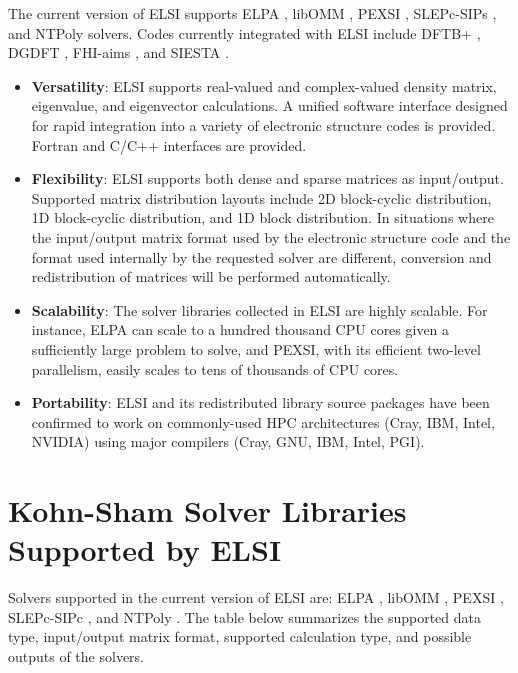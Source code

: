 \documentclass{report}
\begin{document}
The current version of ELSI supports ELPA \cite{elpa_auckenthaler_2011,elpa_marek_2014}, libOMM \cite{libomm_corsetti_2014}, PEXSI \cite{pexsi_lin_2009,pexsi_lin_2013}, SLEPc-SIPs \cite{slepc_hernandez_2005,sips_keceli_2016}, and NTPoly \cite{ntpoly_dawson_2018} solvers.  Codes currently integrated with ELSI include DFTB+ \cite{dftb+_aradi_2007}, DGDFT \cite{dgdft_hu_2015}, FHI-aims \cite{aims_blum_2009}, and SIESTA \cite{siesta_soler_2002}.

\begin{itemize}
\item \textbf{Versatility}:  ELSI supports real-valued and complex-valued density matrix, eigenvalue, and eigenvector calculations.  A unified software interface designed for rapid integration into a variety of electronic structure codes is provided.  Fortran and C/C++ interfaces are provided.

\item \textbf{Flexibility}:  ELSI supports both dense and sparse matrices as input/output.  Supported matrix distribution layouts include 2D block-cyclic distribution, 1D block-cyclic distribution, and 1D block distribution.  In situations where the input/output matrix format used by the electronic structure code and the format used internally by the requested solver are different, conversion and redistribution of matrices will be performed automatically.

\item \textbf{Scalability}:  The solver libraries collected in ELSI are highly scalable.  For instance, ELPA can scale to a hundred thousand CPU cores given a sufficiently large problem to solve, and PEXSI, with its efficient two-level parallelism, easily scales to tens of thousands of CPU cores.

\item \textbf{Portability}:  ELSI and its redistributed library source packages have been confirmed to work on commonly-used HPC architectures (Cray, IBM, Intel, NVIDIA) using major compilers (Cray, GNU, IBM, Intel, PGI).
\end{itemize}

\section{Kohn-Sham Solver Libraries Supported by ELSI}
\label{sec:solvers}
Solvers supported in the current version of ELSI are:  ELPA \cite{elpa_auckenthaler_2011,elpa_marek_2014}, libOMM \cite{libomm_corsetti_2014}, PEXSI \cite{pexsi_lin_2009,pexsi_lin_2013}, SLEPc-SIPc \cite{slepc_hernandez_2005,sips_keceli_2016}, and NTPoly \cite{ntpoly_dawson_2018}.  The table below summarizes the supported data type, input/output matrix format, supported calculation type, and possible outputs of the solvers.
\end{document}
